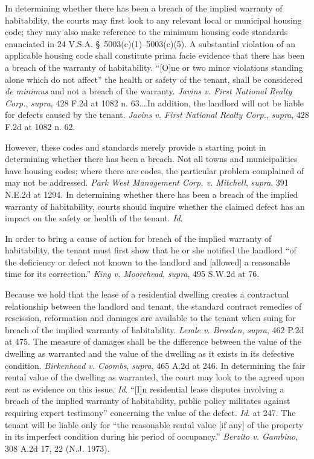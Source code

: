 In determining whether there has been a breach of the implied warranty of
habitability, the courts may first look to any relevant local or municipal
housing code; they may also make reference to the minimum housing code
standards enunciated in 24 V.S.A. \S~5003(c)(1)--5003(c)(5). A substantial
violation of an applicable housing code shall constitute prima facie evidence
that there has been a breach of the warranty of habitability. ``[O]ne or two
minor violations standing alone which do not affect'' the health or safety of
the tenant, shall be considered \textit{de minimus} and not a breach of the
warranty. \textit{Javins v. First National Realty Corp.}, \textit{supra}, 428
F.2d at 1082 n. 63.\ldots In addition, the landlord will not be liable for
defects caused by the tenant. \textit{Javins v. First National Realty Corp.},
\textit{supra}, 428 F.2d at 1082 n. 62.

However, these codes and standards merely provide a starting point in
determining whether there has been a breach. Not all towns and municipalities
have housing codes; where there are codes, the particular problem complained of
may not be addressed. \textit{Park West Management Corp. v. Mitchell},
\textit{supra}, 391 N.E.2d at 1294. In determining whether there has been a
breach of the implied warranty of habitability, courts should inquire whether
the claimed defect has an impact on the safety or health of the tenant.
\textit{Id}.

In order to bring a cause of action for breach of the implied warranty of
habitability, the tenant must first show that he or she notified the landlord
``of the deficiency or defect not known to the landlord and [allowed] a
reasonable time for its correction.'' \textit{King v. Moorehead},
\textit{supra}, 495 S.W.2d at 76.

Because we hold that the lease of a residential dwelling creates a contractual
relationship between the landlord and tenant, the standard contract remedies of
rescission, reformation and damages are available to the tenant when suing for
breach of the implied warranty of habitability. \textit{Lemle v. Breeden},
\textit{supra}, 462 P.2d at 475. The measure of damages shall be the difference
between the value of the dwelling as warranted and the value of the dwelling as
it exists in its defective condition. \textit{Birkenhead v. Coombs},
\textit{supra}, 465 A.2d at 246. In determining the fair rental value of the
dwelling as warranted, the court may look to the agreed upon rent as evidence
on this issue. \textit{Id}. ``[I]n residential lease disputes involving a
breach of the implied warranty of habitability, public policy militates against
requiring expert testimony'' concerning the value of the defect. \textit{Id}.
at 247. The tenant will be liable only for ``the reasonable rental value [if
any] of the property in its imperfect condition during his period of
occupancy.'' \textit{Berzito v. Gambino}, 308 A.2d 17, 22 (N.J. 1973).

